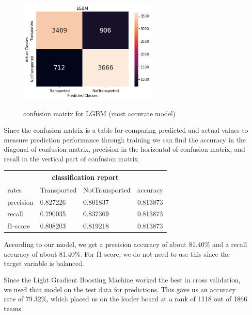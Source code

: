 \documentclass[fleqn,10pt]{SelfArx} %
\begin{document}
\begin{figure}[H]
    \centering
    \includegraphics[width=7cm, height=6cm]{img/confusionmatrix.png}
    \caption{confusion matrix for LGBM (most accurate model)}
    \label{fig:my_label}
\end{figure}
Since the confusion matrix is a table for comparing predicted and actual values to measure prediction performance through training we can find the accuracy in the diagonal of confusion matrix, precision in the horizontal of confusion matrix, and recall in the vertical part of confusion matrix.
\bigskip

\begin{tabular}{ |p{1.18cm}|p{1.6cm}|p{2.1cm}|p{1.2cm}|}
\hline
\multicolumn{4}{|c|}{classification report} \\
\hline
rates & Transported & NotTransported & accuracy\\
\hline
precision & 0.827226 &0.801837 & 0.813873  \\
recall & 0.790035	 & 0.837369&0.813873\\
f1-score & 0.808203&  0.819218 &	0.813873 \\
\hline
\end{tabular}
\bigskip

According to our model, we get a precision accuracy of about 81.40\% and a recall accuracy of about 81.40\%. For f1-score, we do not need to use this since the target variable is balanced.

Since the Light Gradient Boosting Machine worked the best in cross validation, we used that model on the test data for predictions. This gave us an accuracy rate of 79.32\%, which placed us on the leader board at a rank of 1118 out of 1866 teams. 

\bigskip
\bigskip

\end{document}
